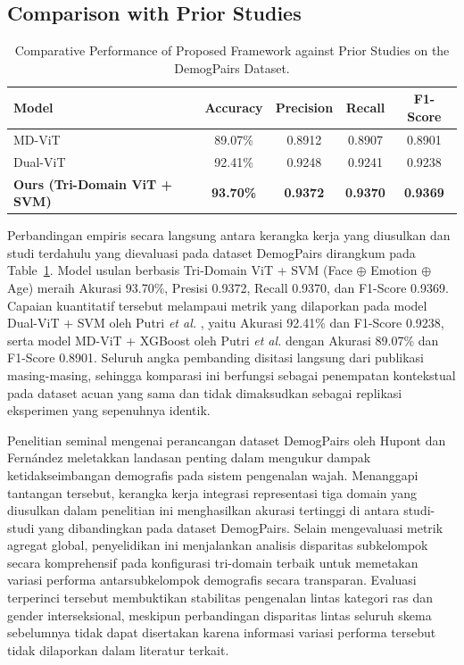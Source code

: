 \subsection{Comparison with Prior Studies}
\label{sec:comparison_prior}

\begin{table}[htbp]
\caption{Comparative Performance of Proposed Framework against Prior Studies on the DemogPairs Dataset.}
\label{tab:XII}
\centering
\begin{tabular}{lcccc}
\toprule
Model & Accuracy & Precision & Recall & F1-Score \\
\midrule
MD-ViT \cite{ref10} & 89.07\% & 0.8912 & 0.8907 & 0.8901 \\
Dual-ViT \cite{ref9} & 92.41\% & 0.9248 & 0.9241 & 0.9238 \\
\textbf{Ours (Tri-Domain ViT + SVM)} & \textbf{93.70\%} & \textbf{0.9372} & \textbf{0.9370} & \textbf{0.9369} \\
\bottomrule
\end{tabular}
\end{table}

Perbandingan empiris secara langsung antara kerangka kerja yang diusulkan dan studi terdahulu yang dievaluasi pada dataset DemogPairs dirangkum pada Table~\ref{tab:XII}. Model usulan berbasis Tri-Domain ViT + SVM (Face $\oplus$ Emotion $\oplus$ Age) meraih Akurasi 93.70\%, Presisi 0.9372, Recall 0.9370, dan F1-Score 0.9369. Capaian kuantitatif tersebut melampaui metrik yang dilaporkan pada model Dual-ViT + SVM oleh Putri \textit{et al.} \cite{ref9}, yaitu Akurasi 92.41\% dan F1-Score 0.9238, serta model MD-ViT + XGBoost oleh Putri \textit{et al.} \cite{ref10} dengan Akurasi 89.07\% dan F1-Score 0.8901. Seluruh angka pembanding disitasi langsung dari publikasi masing-masing, sehingga komparasi ini berfungsi sebagai penempatan kontekstual pada dataset acuan yang sama dan tidak dimaksudkan sebagai replikasi eksperimen yang sepenuhnya identik.

Penelitian seminal mengenai perancangan dataset DemogPairs oleh Hupont dan Fern{\'a}ndez \cite{ref11} meletakkan landasan penting dalam mengukur dampak ketidakseimbangan demografis pada sistem pengenalan wajah. Menanggapi tantangan tersebut, kerangka kerja integrasi representasi tiga domain yang diusulkan dalam penelitian ini menghasilkan akurasi tertinggi di antara studi-studi yang dibandingkan pada dataset DemogPairs. Selain mengevaluasi metrik agregat global, penyelidikan ini menjalankan analisis disparitas subkelompok secara komprehensif pada konfigurasi tri-domain terbaik untuk memetakan variasi performa antarsubkelompok demografis secara transparan. Evaluasi terperinci tersebut membuktikan stabilitas pengenalan lintas kategori ras dan gender interseksional, meskipun perbandingan disparitas lintas seluruh skema sebelumnya tidak dapat disertakan karena informasi variasi performa tersebut tidak dilaporkan dalam literatur terkait.
